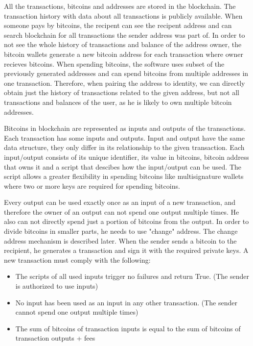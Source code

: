 \documentclass[
  digital, %
  table,   %
  lof,     %
  lot,     %
  oneside
]{fithesis3}
\begin{document}
All the transactions, bitcoins and addresses are stored in the blockchain.
The transaction history with data about all transactions is publicly available.
When someone pays by bitcoins, the recipent can see the recipent address
and can search blockchain for all transactions the sender address was part of.
In order to not see the whole history of transactions and balance of the address owner,
the bitcoin wallets generate a new bitcoin address for each transaction where
owner recieves bitcoins.
When spending bitcoins, the software uses subset of the previously generated addresses and
can spend bitcoins from multiple addresses in one transaction.
Therefore, when pairing the address to identity,
we can directly obtain just the history of transactions related to the given
address, but not all transactions and balances of the user,
as he is likely to own multiple bitcoin addresses.

Bitcoins in blockchain are represented as inputs and outputs of the transactions.
Each transaction has some inputs and outputs. 
Input and output have the same data structure,
they only differ in its relationship to the given transaction.
Each input/output consists of its unique identifier, its value in bitcoins,
bitcoin address that owns it and a script that descibes how the input/output can be used.
The script allows a greater flexibility in spending bitcoins like multisignature wallets where
two or more keys are required for spending bitcoins.

Every output can be used exactly once as an input of a new transaction,
and therefore the owner of an output can not
spend one output multiple times. He also can not directly
spend just a portion of bitcoins from the output. In order to divide bitcoins in smaller parts,
he needs to use "change" address. The change address mechanism is described later.
When the sender sends a bitcoin to the recipient, he generates a transaction
and sign it with the required private keys.
A new transaction must comply with the following:

\begin{itemize}
  \item The scripts of all used inputs trigger no failures and return True. (The sender is authorized to use inputs)
  \item No input has been used as an input in any other transaction. \newline (The sender cannot spend one output multiple times)
  \item The sum of bitcoins of transaction inputs is equal to the sum of bitcoins of transaction outputs + fees
\end{itemize}
\end{document}
